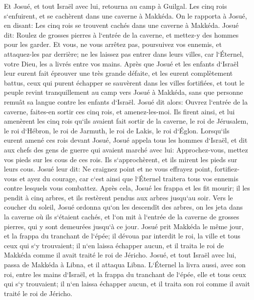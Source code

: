 \verse Et Josué, et tout Israël avec lui, retourna au camp à Guilgal. 
\verse Les cinq rois s`enfuirent, et se cachèrent dans une caverne à Makkéda. 
\verse On le rapporta à Josué, en disant: Les cinq rois se trouvent cachés dans une caverne à Makkéda. 
\verse Josué dit: Roulez de grosses pierres à l`entrée de la caverne, et mettez-y des hommes pour les garder. 
\verse Et vous, ne vous arrêtez pas, poursuivez vos ennemis, et attaquez-les par derrière; ne les laissez pas entrer dans leurs villes, car l`Éternel, votre Dieu, les a livrés entre vos mains. 
\verse Après que Josué et les enfants d`Israël leur eurent fait éprouver une très grande défaite, et les eurent complètement battus, ceux qui purent échapper se sauvèrent dans les villes fortifiées, 
\verse et tout le peuple revint tranquillement au camp vers Josué à Makkéda, sans que personne remuât sa langue contre les enfants d`Israël. 
\verse Josué dit alors: Ouvrez l`entrée de la caverne, faites-en sortir ces cinq rois, et amenez-les-moi. 
\verse Ils firent ainsi, et lui amenèrent les cinq rois qu`ils avaient fait sortir de la caverne, le roi de Jérusalem, le roi d`Hébron, le roi de Jarmuth, le roi de Lakis, le roi d`Églon. 
\verse Lorsqu`ils eurent amené ces rois devant Josué, Josué appela tous les hommes d`Israël, et dit aux chefs des gens de guerre qui avaient marché avec lui: Approchez-vous, mettez vos pieds sur les cous de ces rois. Ils s`approchèrent, et ils mirent les pieds sur leurs cous. 
\verse Josué leur dit: Ne craignez point et ne vous effrayez point, fortifiez-vous et ayez du courage, car c`est ainsi que l`Éternel traitera tous vos ennemis contre lesquels vous combattez. 
\verse Après cela, Josué les frappa et les fit mourir; il les pendit à cinq arbres, et ils restèrent pendus aux arbres jusqu`au soir. 
\verse Vers le coucher du soleil, Josué ordonna qu`on les descendît des arbres, on les jeta dans la caverne où ils s`étaient cachés, et l`on mit à l`entrée de la caverne de grosses pierres, qui y sont demeurées jusqu`à ce jour. 
\verse Josué prit Makkéda le même jour, et la frappa du tranchant de l`épée; il dévoua par interdit le roi, la ville et tous ceux qui s`y trouvaient; il n`en laissa échapper aucun, et il traita le roi de Makkéda comme il avait traité le roi de Jéricho. 
\verse Josué, et tout Israël avec lui, passa de Makkéda à Libna, et il attaqua Libna. 
\verse L`Éternel la livra aussi, avec son roi, entre les mains d`Israël, et la frappa du tranchant de l`épée, elle et tous ceux qui s`y trouvaient; il n`en laissa échapper aucun, et il traita son roi comme il avait traité le roi de Jéricho. 
